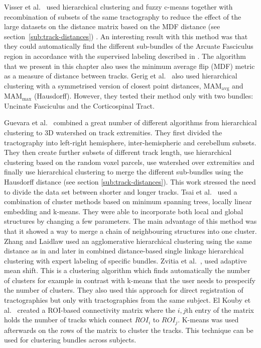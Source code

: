 \documentclass{bioinfo}
\begin{document}
Visser et al.~\cite{Visser2010} used hierarchical clustering and
fuzzy c-means together with recombination of subsets of the same tractography
to reduce the effect of the large datasets on the distance matrix
based on the MDF distance (see section~\ref{sub:track-distances})
\cite{EGMB10}. An interesting result with this method was that they
could automatically find the different sub-bundles of the Arcuate
Fasciculus region in accordance with the supervised labeling described
in \cite{catani2005perisylvian}. The algorithm that we present in
this chapter also uses the minimum average flip (MDF) metric as a
measure of distance between tracks. Gerig et al.~\cite{gerig2004analysis}
also used hierarchical clustering with a symmetrised version of closest
point distances, $\mathrm{MA}\mathrm{M}_{\mathrm{avg}}$ and $\mathrm{MA}\mathrm{M}_{\mathrm{max}}$
(Hausdorff). However, they tested their method only with two bundles:
Uncinate Fasciculus and the Corticospinal Tract. 

Guevara et al.~\cite{Guevara2010} combined a great number of different
algorithms from hierarchical clustering to 3D watershed on track extremities.
They first divided the tractography into left-right hemisphere, inter-hemispheric
and cerebellum subsets. They then create further subsets of different
track length, use hierarchical clustering based on the random voxel
parcels, use watershed over extremities and finally use hierarchical
clustering to merge the different sub-bundles using the Hausdorff
distance (see section \ref{sub:track-distances}). This work stressed
the need to divide the data set between shorter and longer tracks.
Tsai et al.~\cite{Tsai2007} used a combination of cluster methods
based on minimum spanning trees, locally linear embedding and k-means.
They were able to incorporate both local and global structures by
changing a few parameters. The main advantage of this method was that
it showed a way to merge a chain of neighbouring structures into one
cluster. Zhang and Laidlaw \cite{zhang2005dti} used an agglomerative
hierarchical clustering using the same distance as in \cite{zhang2003visualizing}
and later in \cite{zhang2008identifying} combined distance-based
single linkage hierarchical clustering with expert labeling of specific
bundles. Zvitia et al.~\cite{zvitia2008adaptive}, \cite{Zvitia2010}
used adaptive mean shift. This is a clustering algorithm which finds
automatically the number of clusters for example in contrast with
k-means that the user needs to prespecify the number of clusters.
They also used this approach for direct registration of tractographies
but only with tractographies from the same subject. El Kouby et al.~\cite{ElKouby2005}
created a ROI-based connectivity matrix where the $i,j$th entry of
the matrix holds the number of tracks which connect $ROI_{i}$ to
$ROI_{j}$. K-means was used afterwards on the rows of the matrix
to cluster the tracks. This technique can be used for clustering bundles
across subjects.
\end{document}

